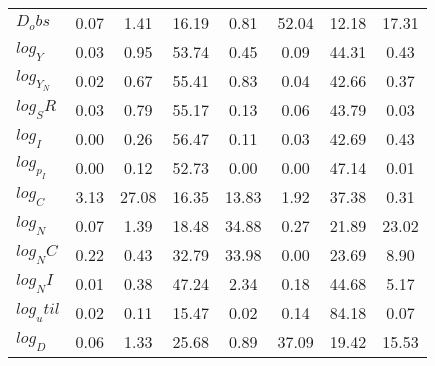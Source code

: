 \begin{center}
\begin{longtable}{lccccccc}
$D_obs     $	 & 	        0.07	 & 	        1.41	 & 	       16.19	 & 	        0.81	 & 	       52.04	 & 	       12.18	 & 	       17.31 \\ 
$log_Y     $	 & 	        0.03	 & 	        0.95	 & 	       53.74	 & 	        0.45	 & 	        0.09	 & 	       44.31	 & 	        0.43 \\ 
$log_Y_N   $	 & 	        0.02	 & 	        0.67	 & 	       55.41	 & 	        0.83	 & 	        0.04	 & 	       42.66	 & 	        0.37 \\ 
$log_SR    $	 & 	        0.03	 & 	        0.79	 & 	       55.17	 & 	        0.13	 & 	        0.06	 & 	       43.79	 & 	        0.03 \\ 
$log_I     $	 & 	        0.00	 & 	        0.26	 & 	       56.47	 & 	        0.11	 & 	        0.03	 & 	       42.69	 & 	        0.43 \\ 
$log_p_I   $	 & 	        0.00	 & 	        0.12	 & 	       52.73	 & 	        0.00	 & 	        0.00	 & 	       47.14	 & 	        0.01 \\ 
$log_C     $	 & 	        3.13	 & 	       27.08	 & 	       16.35	 & 	       13.83	 & 	        1.92	 & 	       37.38	 & 	        0.31 \\ 
$log_N     $	 & 	        0.07	 & 	        1.39	 & 	       18.48	 & 	       34.88	 & 	        0.27	 & 	       21.89	 & 	       23.02 \\ 
$log_NC    $	 & 	        0.22	 & 	        0.43	 & 	       32.79	 & 	       33.98	 & 	        0.00	 & 	       23.69	 & 	        8.90 \\ 
$log_NI    $	 & 	        0.01	 & 	        0.38	 & 	       47.24	 & 	        2.34	 & 	        0.18	 & 	       44.68	 & 	        5.17 \\ 
$log_util  $	 & 	        0.02	 & 	        0.11	 & 	       15.47	 & 	        0.02	 & 	        0.14	 & 	       84.18	 & 	        0.07 \\ 
$log_D     $	 & 	        0.06	 & 	        1.33	 & 	       25.68	 & 	        0.89	 & 	       37.09	 & 	       19.42	 & 	       15.53 \\ 
\end{longtable}
 \end{center}
